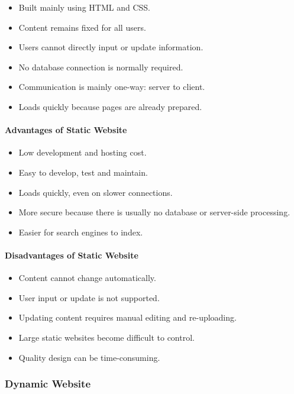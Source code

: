 \begin{itemize}
    \item Built mainly using HTML and CSS.
    \item Content remains fixed for all users.
    \item Users cannot directly input or update information.
    \item No database connection is normally required.
    \item Communication is mainly one-way: server to client.
    \item Loads quickly because pages are already prepared.
\end{itemize}

\paragraph{Advantages of Static Website}

\begin{itemize}
    \item Low development and hosting cost.
    \item Easy to develop, test and maintain.
    \item Loads quickly, even on slower connections.
    \item More secure because there is usually no database or server-side processing.
    \item Easier for search engines to index.
\end{itemize}

\paragraph{Disadvantages of Static Website}

\begin{itemize}
    \item Content cannot change automatically.
    \item User input or update is not supported.
    \item Updating content requires manual editing and re-uploading.
    \item Large static websites become difficult to control.
    \item Quality design can be time-consuming.
\end{itemize}


\subsubsection{Dynamic Website}

